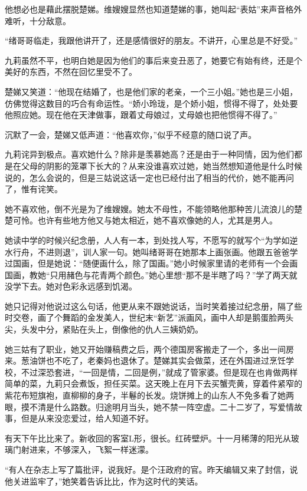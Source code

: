 \par 他想必也是藉此摆脱楚娣。维嫂嫂显然也知道楚娣的事，她叫起“表姑”来声音格外难听，十分敌意。
\par “绪哥哥临走，我跟他讲开了，还是感情很好的朋友。不讲开，心里总是不好受。”
\par 九莉虽然不平，也明白她是因为他们的事后来变丑恶了，她要它有始有终，还是个美好的东西，不然在回忆里受不了。
\par 楚娣又笑道：“他现在结婚了，也是他们家的老亲，一个三小姐。”她也是三小姐，仿佛觉得这数目的巧合有命运性。“娇小玲珑，是个娇小姐，惯得不得了，处处要他照应她。现在他在天津做事，跟着丈母娘过，丈母娘也把他惯得不得了。”
\par 沉默了一会，楚娣又低声道：“他喜欢你，”似乎不经意的随口说了声。
\par 九莉诧异到极点。喜欢她什么？除非是羡慕她高？还是由于一种同情，因为他们都是在父母的阴影的笼罩下长大的？从来没谁喜欢过她，她当然想知道他是什么时候说的，怎么会说的，但是三姑说这话一定也已经付出了相当的代价，她不能再问了，惟有诧笑。
\par 她不喜欢他，倒不光是为了维嫂嫂。她太不母性，不能领略他那种苦儿流浪儿的楚楚可怜。也许有些地方他又与她太相近，她不喜欢像她的人，尤其是男人。
\par 她读中学的时候兴纪念册，人人有一本，到处找人写，不愿写的就写个“为学如逆水行舟，不进则退”，训人家一句。她叫绪哥哥在她那本上画张画。他跟五爸爸学过国画，但是她说：“随便画什么，除了国画。”她小时候家里请的老师有一个会画国画，教她“只用赭色与花青两个颜色。”她心里想“那不是半瞎了吗？”学了两天就没学下去。她对色彩永远感到饥渴。
\par 她只记得对他说过这么句话，他更从来不跟她说话，当时笑着接过纪念册，隔了些时交卷，画了个舞蹈的金发美人，世纪末“新艺”派画风，画中人却是鹅蛋脸两头尖，头发中分，紧贴在头上，倒像他的仇人三姨奶奶。
\par 她三姑有了职业，她又开始赚稿费之后，两个德国房客搬走了一个，多出一间房来。葱油饼也不吃了，老秦妈也退休了。楚娣其实会做菜，还在外国进过烹饪学校，不过深恐套进，“一回是情，二回是例，”就成了管家婆。但是现在也肯做两样简单的菜，九莉只会煮饭，担任买菜。这天晚上在月下去买蟹壳黄，穿着件紧窄的紫花布短旗袍，直柳柳的身子，半鬈的长发。烧饼摊上的山东人不免多看了她两眼，摸不清是什么路数。归途明月当头，她不禁一阵空虚。二十二岁了，写爱情故事，但是从来没恋爱过，给人知道不好。
\par 有天下午比比来了。新收回的客室L形，很长。红砖壁炉。十一月稀薄的阳光从玻璃门射进来，不够深入，飞絮一样迷濛。
\par “有人在杂志上写了篇批评，说我好。是个汪政府的官。昨天编辑又来了封信，说他关进监牢了，”她笑着告诉比比，作为这时代的笑话。
